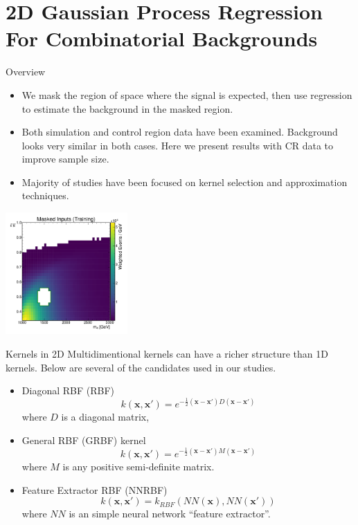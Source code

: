 \documentclass[10pt]{beamer}
\begin{document}
\section[Regression Results]{2D Gaussian Process Regression For Combinatorial Backgrounds}
\label{sec:2d-gauss-proc}

\begin{frame}{Overview}
  \begin{itemize}
  \item We mask the region of space where the signal is expected, then use regression to estimate the background in the masked region.
  \item Both simulation and control region data have been examined. Background looks very similar in both cases. Here we present results with CR data to improve sample size. 
  \item Majority of studies have been focused on kernel selection and approximation techniques.
  \end{itemize}
  \begin{center}
    \includegraphics[width=0.35\textwidth]{figures/training_points}
  \end{center}
\end{frame}

\begin{frame}{Kernels in 2D}
  Multidimentional kernels can have a richer structure than 1D kernels. Below are several of the candidates used in our studies.
  \begin{itemize}
  \item Diagonal RBF (RBF)
    \begin{equation}
      k(\bm{x},\bm{x'}) = e^{ -\frac{1}{2} \left(  \bm{x} - \bm{x'}\right) D \left(  \bm{x} - \bm{x'}\right)}
    \end{equation}
    where $D$ is a diagonal matrix,
  \item General RBF (GRBF) kernel
    \begin{equation}
      k(\bm{x},\bm{x'}) = e^{ -\frac{1}{2} \left(  \bm{x} - \bm{x'}\right) M \left(  \bm{x} - \bm{x'}\right)}
    \end{equation}
    where $M$ is any positive semi-definite matrix.
  \item Feature Extractor RBF (NNRBF)
    \begin{equation}
      k(\bm{x},\bm{x'}) =  k_{RBF}(NN(\bm{x}),NN(\bm{x'}))
    \end{equation}
    where $NN$ is an simple neural network ``feature extractor''.
  \end{itemize}
\end{frame}
\end{document}
